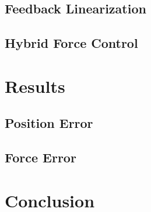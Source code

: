 \documentclass[letterpaper,12pt]{report}
\begin{document}
\section{Feedback Linearization}
\section{Hybrid Force Control}

\chapter{Results}
\section{Position Error}
\section{Force Error}


\chapter{Conclusion}
\end{document}
